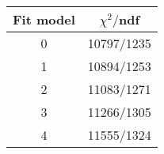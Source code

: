 \begin{tabular}{c|c}
Fit model & $\chi^2/$ndf \\
\hline
0 & 10797/1235\\
1 & 10894/1253\\
2 & 11083/1271\\
3 & 11266/1305\\
4 & 11555/1324\\
\end{tabular}
